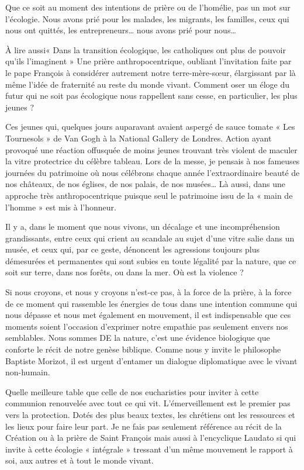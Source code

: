 Que ce soit au moment des intentions de prière ou de l’homélie, pas un mot sur l’écologie. Nous avons prié pour les malades, les migrants, les familles, ceux qui nous ont quittés, les entrepreneurs… nous avons prié pour nous…

À lire aussi« Dans la transition écologique, les catholiques ont plus de pouvoir qu’ils l’imaginent »
Une prière anthropocentrique, oubliant l’invitation faite par le pape François à considérer autrement notre terre-mère-sœur, élargissant par là même l’idée de fraternité au reste du monde vivant. Comment oser un éloge du futur qui ne soit pas écologique nous rappellent sans cesse, en particulier, les plus jeunes ?
 
Ces jeunes qui, quelques jours auparavant avaient aspergé de sauce tomate « Les Tournesols » de Van Gogh à la National Gallery de Londres. Action ayant provoqué une réaction offusquée de moins jeunes trouvant très violent de maculer la vitre protectrice du célèbre tableau. Lors de la messe, je pensais à nos fameuses journées du patrimoine où nous célébrons chaque année l’extraordinaire beauté de nos châteaux, de nos églises, de nos palais, de nos musées… Là aussi, dans une approche très anthropocentrique puisque seul le patrimoine issu de la « main de l’homme » est mis à l’honneur.

Il y a, dans le moment que nous vivons, un décalage et une incompréhension grandissants, entre ceux qui crient au scandale au sujet d’une vitre salie dans un musée, et ceux qui, par ce geste, dénoncent les agressions toujours plus démesurées et permanentes qui sont subies en toute légalité par la nature, que ce soit sur terre, dans nos forêts, ou dans la mer. Où est la violence ?
 
Si nous croyons, et nous y croyons n’est-ce pas, à la force de la prière, à la force de ce moment qui rassemble les énergies de tous dans une intention commune qui nous dépasse et nous met également en mouvement, il est indispensable que ces moments soient l’occasion d’exprimer notre empathie pas seulement envers nos semblables. Nous sommes DE la nature, c’est une évidence biologique que conforte le récit de notre genèse biblique. Comme nous y invite le philosophe Baptiste Morizot, il est urgent d’entamer un dialogue diplomatique avec le vivant non-humain.


Quelle meilleure table que celle de nos eucharisties pour inviter à cette communion renouvelée avec tout ce qui vit. L’émerveillement est le premier pas vers la protection. Dotés des plus beaux textes, les chrétiens ont les ressources et les lieux pour faire leur part. Je ne fais pas seulement référence au récit de la Création ou à la prière de Saint François mais aussi à l’encyclique Laudato si qui invite à cette écologie « intégrale » tressant d’un même mouvement le rapport à soi, aux autres et à tout le monde vivant.
